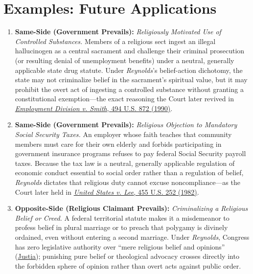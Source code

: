 \documentclass[12pt]{article}
\begin{document}
\section{Examples: Future Applications}

\begin{enumerate}
\item \textbf{Same-Side (Government Prevails):} \textit{Religiously Motivated Use of Controlled Substances.} Members of a religious sect ingest an illegal hallucinogen as a central sacrament and challenge their criminal prosecution (or resulting denial of unemployment benefits) under a neutral, generally applicable state drug statute. Under \textit{Reynolds}'s belief-action dichotomy, the state may not criminalize belief in the sacrament's spiritual value, but it may prohibit the overt act of ingesting a controlled substance without granting a constitutional exemption---the exact reasoning the Court later revived in \href{https://supreme.justia.com/cases/federal/us/494/872/}{\textit{Employment Division v. Smith}, 494 U.S. 872 (1990)}.

\item \textbf{Same-Side (Government Prevails):} \textit{Religious Objection to Mandatory Social Security Taxes.} An employer whose faith teaches that community members must care for their own elderly and forbids participating in government insurance programs refuses to pay federal Social Security payroll taxes. Because the tax law is a neutral, generally applicable regulation of economic conduct essential to social order rather than a regulation of belief, \textit{Reynolds} dictates that religious duty cannot excuse noncompliance---as the Court later held in \href{https://supreme.justia.com/cases/federal/us/455/252/}{\textit{United States v. Lee}, 455 U.S. 252 (1982)}.

\item \textbf{Opposite-Side (Religious Claimant Prevails):} \textit{Criminalizing a Religious Belief or Creed.} A federal territorial statute makes it a misdemeanor to profess belief in plural marriage or to preach that polygamy is divinely ordained, even without entering a second marriage. Under \textit{Reynolds}, Congress has zero legislative authority over ``mere religious belief and opinions'' (\href{https://supreme.justia.com/cases/federal/us/98/145/}{Justia}); punishing pure belief or theological advocacy crosses directly into the forbidden sphere of opinion rather than overt acts against public order.


\end{enumerate}
\end{document}
